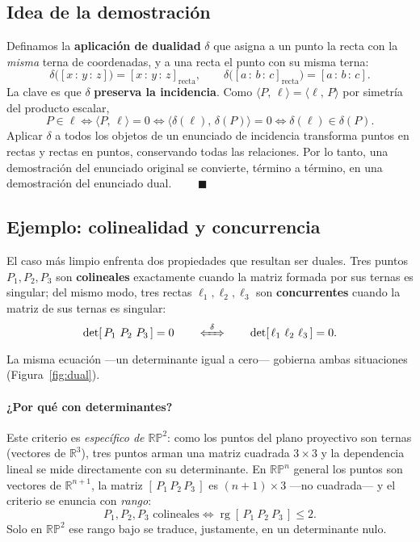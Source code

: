 \documentclass[11pt,a4paper]{article}
\newcommand{\RP}{\mathbb{RP}}
\newcommand{\R}{\mathbb{R}}
\newcommand{\inc}[2]{\langle #1,\, #2\rangle}
\newcommand{\hp}[3]{[#1\,{:}\,#2\,{:}\,#3]}
\begin{document}
\subsection{Idea de la demostración}

Definamos la \textbf{aplicación de dualidad} $\delta$ que asigna a un
punto la recta con la \emph{misma} terna de coordenadas, y a una recta el
punto con su misma terna:
\[
  \delta\bigl(\hp{x}{y}{z}\bigr) = \hp{x}{y}{z}_{\text{recta}},
  \qquad
  \delta\bigl(\hp{a}{b}{c}_{\text{recta}}\bigr) = \hp{a}{b}{c}.
\]
La clave es que $\delta$ \textbf{preserva la incidencia}. Como
$\inc{P}{\ell}=\inc{\ell}{P}$ por simetría del producto escalar,
\[
  P\in\ell
  \iff \inc{P}{\ell}=0
  \iff \inc{\delta(\ell)}{\delta(P)}=0
  \iff \delta(\ell)\in\delta(P).
\]
Aplicar $\delta$ a todos los objetos de un enunciado de incidencia
transforma puntos en rectas y rectas en puntos, conservando todas las
relaciones. Por lo tanto, una demostración del enunciado original se
convierte, término a término, en una demostración del enunciado dual.
$\qquad\blacksquare$

\subsection{Ejemplo: colinealidad y concurrencia}

El caso más limpio enfrenta dos propiedades que resultan ser duales. Tres
puntos $P_1,P_2,P_3$ son \textbf{colineales} exactamente cuando la matriz
formada por sus ternas es singular; del mismo modo, tres rectas
$\ell_1,\ell_2,\ell_3$ son \textbf{concurrentes} cuando la matriz de sus
ternas es singular:
\[
  \det[\,P_1\ P_2\ P_3\,]=0
  \qquad\xLeftrightarrow{\ \delta\ }\qquad
  \det[\,\ell_1\ \ell_2\ \ell_3\,]=0.
\]
La misma ecuación —un determinante igual a cero— gobierna ambas
situaciones (Figura~\ref{fig:dual}).

\paragraph{¿Por qué con determinantes?}
Este criterio es \emph{específico de $\RP^2$}: como los puntos del plano
proyectivo son ternas (vectores de $\R^3$), tres puntos arman una matriz
cuadrada $3\times 3$ y la dependencia lineal se mide directamente con su
determinante. En $\RP^n$ general los puntos son vectores de $\R^{n+1}$,
la matriz $[\,P_1\,P_2\,P_3\,]$ es $(n+1)\times 3$ —no cuadrada— y el
criterio se enuncia con \emph{rango}:
\[
  P_1,P_2,P_3 \text{ colineales}
  \iff \operatorname{rg}[\,P_1\ P_2\ P_3\,] \le 2.
\]
Solo en $\RP^2$ ese rango bajo se traduce, justamente, en un determinante
nulo.
\end{document}
